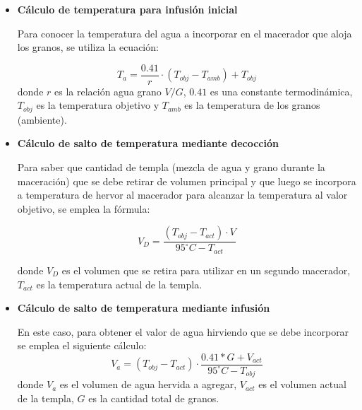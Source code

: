             \begin{itemize}
                \item \textbf{Cálculo de temperatura para infusión inicial}
                \par Para conocer la temperatura del agua a incorporar en el macerador que aloja los granos, se utiliza la ecuación:
                
                \begin{equation}
                    T_a = \frac{0.41}{r} \cdot (T_{obj} - T_{amb}) + T_{obj}
                    \label{EcuacionInfusion}
                \end{equation}
                donde $r$ es la relación agua grano $V/G$, $0.41$ es una constante termodinámica, $T_{obj}$ es la temperatura objetivo y $T_{amb}$ es la temperatura de los granos (ambiente). 
                
                \item \textbf{Cálculo de salto de temperatura mediante decocción}
                \par Para saber que cantidad de templa (mezcla de agua y grano durante la maceración) que se debe retirar de volumen principal y que luego se incorpora a temperatura de hervor al macerador para alcanzar la temperatura al valor objetivo, se emplea la fórmula:
                
                \begin{equation}
                    V_D = \frac{(T_{obj} - T_{act}) \cdot V }{95^{\circ}C - T_{act}}
                    \label{EcuacionDecoccion}
                \end{equation}
                
                \par donde $V_D$ es el volumen que se retira para utilizar en un segundo macerador, $T_{act}$ es la temperatura actual de la templa. 
                
                \item \textbf{Cálculo de salto de temperatura mediante infusión}
                \par En este caso, para obtener el valor de agua hirviendo que se debe incorporar se emplea el siguiente cálculo:
                \begin{equation}
                    V_a = (T_{obj} - T_{act}) \cdot \frac{0.41 * G + V_{act}}{95^{\circ}C - T_{obj}}
                \label{EcuacionEscalon}
                \end{equation}
                donde $V_a$ es el volumen de agua hervida a agregar,   $V_{act}$ es el volumen actual de la templa, $G$ es la cantidad total de granos.
                

\end{itemize}
